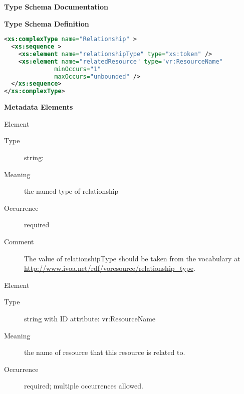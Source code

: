 \documentclass[11pt,a4paper]{ivoa}
\begin{document}
\begin{generated}
\begingroup
        \renewcommand*\descriptionlabel[1]{%
        \hbox to 5.5em{\emph{#1}\hfil}}\vspace{2ex}\noindent\textbf{ Type Schema Documentation}


\vspace{1ex}\noindent\textbf{ Type Schema Definition}

\begin{lstlisting}[language=XML,basicstyle=\footnotesize]
<xs:complexType name="Relationship" >
  <xs:sequence >
    <xs:element name="relationshipType" type="xs:token" />
    <xs:element name="relatedResource" type="vr:ResourceName"
              minOccurs="1"
              maxOccurs="unbounded" />
  </xs:sequence>
</xs:complexType>
\end{lstlisting}

\vspace{0.5ex}\noindent\textbf{ Metadata Elements}

\begingroup\small\begin{bigdescription}\item[Element \xmlel{relationshipType}]
\begin{description}
\item[Type] string: 
\item[Meaning]
                  the named type of relationship

\item[Occurrence] required
\item[Comment]
                 The value  of relationshipType should be taken from the
                 vocabulary at
                 \url{http://www.ivoa.net/rdf/voresource/relationship_type}.


\end{description}
\item[Element \xmlel{relatedResource}]
\begin{description}
\item[Type] string with ID attribute: vr:ResourceName
\item[Meaning]
                  the name of resource that this resource is related to.

\item[Occurrence] required; multiple occurrences allowed.

\end{description}


\end{bigdescription}\endgroup

\endgroup
\end{generated}
\end{document}
